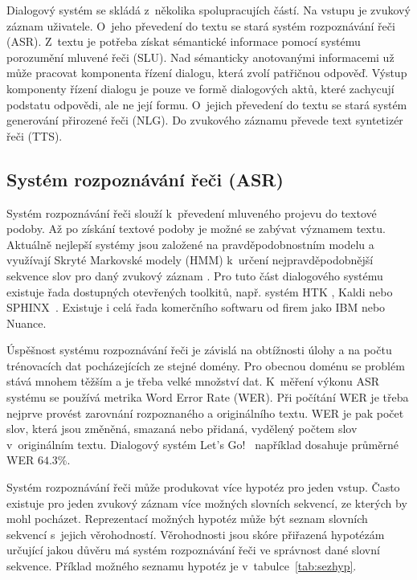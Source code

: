Dialogový systém se skládá z~několika spolupracujích částí.
Na vstupu je zvukový záznam uživatele.
O~jeho převedení do textu se stará systém rozpoznávání řeči (ASR).
Z~textu je potřeba získat sémantické informace pomocí systému porozumění mluvené řeči (SLU).
Nad sémanticky anotovanými informacemi už může pracovat komponenta řízení dialogu, která zvolí patřičnou odpověď.
Výstup komponenty řízení dialogu je pouze ve formě dialogových aktů, které zachycují podstatu odpovědi, ale ne její formu.
O~jejich převedení do textu se stará systém generování přirozené řeči (NLG).
Do zvukového záznamu převede text syntetizér řeči (TTS).

\subsection{Systém rozpoznávání řeči (ASR)}

Systém rozpoznávání řeči slouží k~převedení mluveného projevu do textové podoby.
Až po získání textové podoby je možné se zabývat významem textu.
Aktuálně nejlepší systémy jsou založené na pravděpodobnostním modelu a využívají Skryté Markovské modely (HMM) k~určení nejpravděpodobnější sekvence slov pro daný zvukový záznam \cite{juang1991hidden}.
Pro tuto část dialogového systému existuje řada dostupných otevřených toolkitů, např. systém HTK \cite{young2002htk}, Kaldi \cite{Povey_ASRU2011} nebo SPHINX~\cite{walker2004sphinx}.
Existuje i celá řada komerčního softwaru od firem jako IBM nebo Nuance.

Úspěšnost systému rozpoznávání řeči je závislá na obtížnosti úlohy a na počtu trénovacích dat pocházejících ze stejné domény.
Pro obecnou doménu se problém stává mnohem těžším a je třeba velké množství dat.
K~měření výkonu ASR systému se používá metrika Word Error Rate (WER).
Při počítání WER je třeba nejprve provést zarovnání rozpoznaného a originálního textu.
WER je pak počet slov, která jsou změněná, smazaná nebo přidaná, vydělený počtem slov v~originálním textu.
Dialogový systém Let's Go!~\cite{raux2006doing} například dosahuje průměrné WER $64.3\%$.

Systém rozpoznávání řeči může produkovat více hypotéz pro jeden vstup.
Často existuje pro jeden zvukový záznam více možných slovních sekvencí, ze kterých by mohl pocházet.
Reprezentací možných hypotéz může být seznam slovních sekvencí s~jejich věrohodností.
Věrohodnosti jsou skóre přiřazená hypotézám určující jakou důvěru má systém rozpoznávání řeči ve správnost dané slovní sekvence.
Příklad možného seznamu hypotéz je v~tabulce~\ref{tab:sezhyp}.


